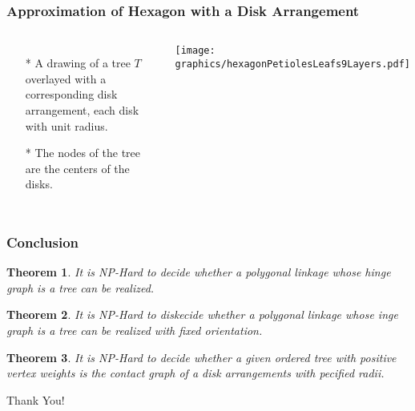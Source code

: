 \documentclass{beamer}
\newtheorem{thm}{Theorem}
\begin{document}
\begin{frame} \frametitle{Approximation of Hexagon with a Disk Arrangement}
    \begin{columns}[c]
        \begin{itemize}
            \item[*] A drawing of a tree $T$ overlayed with a corresponding disk arrangement, each disk with unit radius.
            \item[*] The nodes of the tree are the centers of the disks.
        \end{itemize}
        \begin{minipage}{\linewidth}
            \begin{center}
            \texttt{[image: graphics/hexagonPetiolesLeafs9Layers.pdf]}\label{gfx:hexagonPetiolesLeafs9Layers.pdf}
            \end{center}
        \end{minipage}
    \end{columns}
\end{frame}
\begin{frame}\frametitle{Conclusion}
\begin{thm}
     It is NP-Hard to decide whether a polygonal linkage whose hinge graph is a \textit{tree} can be realized.
     \end{thm}
    \begin{thm}It is NP-Hard to diskecide whether a polygonal linkage whose inge graph is a \textit{tree} can be realized with fixed orientation.\end{thm}
    \begin{thm}It is NP-Hard to decide whether a given ordered tree with positive vertex weights is the contact graph of a disk arrangements with pecified radii.\end{thm}
\end{frame}

\begin{frame}
\begin{center}
Thank You!
\end{center}
\end{frame}
\end{document}
